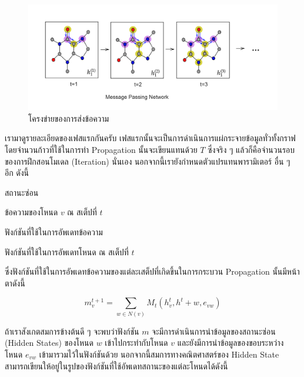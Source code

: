 \begin{figure}[H]
    \centering
    \includegraphics[width=\linewidth]{fig/mp-network.png}
    \caption{โครงข่ายของการส่งข้อความ}
    \label{fig:mp_network}
\end{figure}

เรามาดูรายละเอียดของเฟสแรกกันครับ เฟสแรกนั้นจะเป็นการดำเนินการแผ่กระจายข้อมูลทั่วทั้งกราฟ โดยจำนวนก้าวที่ใช้ในการทำ Propagation 
นั้นจะเขียนแทนด้วย $T$ ซึ่งจริง ๆ แล้วก็คือจำนวนรอบของการฝึกสอนโมเดล (Iteration) นั่นเอง นอกจากนี้เรายังกำหนดตัวแปรแทนพารามิเตอร์%
อื่น ๆ อีก ดังนี้

\begin{description}[font=$\bullet$]
    \item[$h$] สถานะซ่อน
    
    \item[$m^{t}_{v}$] ข้อความของโหนด $v$ ณ สเต็ปที่ $t$
    
    \item[$M$] ฟังก์ชันที่ใช้ในการอัพเดทข้อความ
    
    \item[$U_{t}$] ฟังก์ชันที่ใช้ในการอัพเดทโหนด ณ สเต็ปที่ $t$    
\end{description}

ซึ่งฟังก์ชันที่ใช้ในการอัพเดทข้อความของแต่ละเสต็ปที่เกิดขึ้นในการกระบวน Propagation นั้นมีหน้าตาดังนี้

\begin{equation}\label{eq:msg_func}
    m^{t+1}_{v} = \sum_{w \in N(v)} M_{t} (h^{t}_{v}, h^{t}+{w}, e_{vw})
\end{equation}

\noindent ถ้าเราสังเกตสมการข้างต้นดี ๆ จะพบว่าฟังก์ชัน $m$ จะมีการดำเนินการนำข้อมูลของสถานะซ่อน (Hidden States) ของโหนด $w$ 
เข้าไปกระทำกับโหนด $v$ และยังมีการนำข้อมูลของขอบระหว่างโหนด $e_{vw}$ เข้ามารวมไว้ในฟังก์ชันด้วย นอกจากนี้สมการทางคณิตศาสตร์ของ 
Hidden State สามารถเขียนให้อยู่ในรูปของฟังก์ชันที่ใช้อัพเดทสถานะของแต่ละโหนดได้ดังนี้ 

